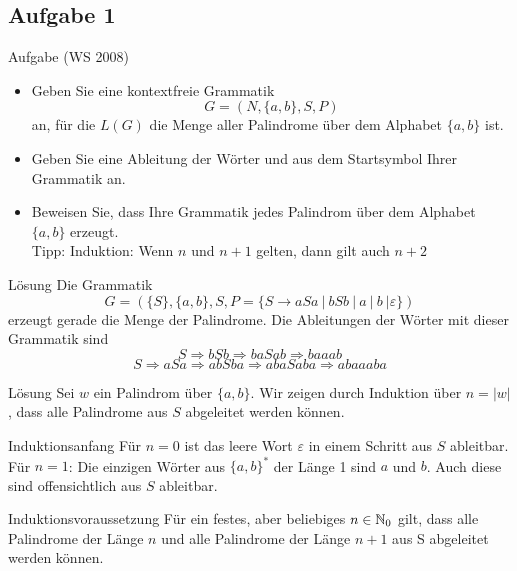 \subsection{Aufgabe 1}
\begin{frame}{Aufgabe (WS 2008) }
	\begin{itemize}
		\item Geben Sie eine kontextfreie Grammatik $$G = (N, \{a, b\}, S, P )$$ an, für die $L(G)$ die Menge aller Palindrome über dem Alphabet $\{a, b\}$ ist.
		\item Geben Sie eine Ableitung der Wörter  und  aus dem Startsymbol Ihrer Grammatik an.
		\item Beweisen Sie, dass Ihre Grammatik jedes Palindrom über dem Alphabet $\{a, b\}$ erzeugt.\\
		Tipp: Induktion: Wenn $n$ und $n+1$ gelten, dann gilt auch $n+2$
	\end{itemize}
\end{frame}

\begin{frame}{Lösung}
	Die Grammatik $$G = (\{S\}, \{a, b\}, S, P = \{S \to aSa \ | \ bSb \ | \ a \ | \ b \ | \varepsilon \})$$ erzeugt gerade die Menge der Palindrome. \pause Die Ableitungen der Wörter mit dieser Grammatik sind 
	$$S \Rightarrow bSb \Rightarrow baSab \Rightarrow baaab$$
	$$S \Rightarrow aSa \Rightarrow abSba \Rightarrow abaSaba \Rightarrow abaaaba$$
\end{frame}

\begin{frame}{Lösung}
	Sei $w$ ein Palindrom über $\{a, b\}$. Wir zeigen durch Induktion über $n = \vert w \vert$, dass alle Palindrome aus $S$ abgeleitet werden können. \pause
	\begin{block}{Induktionsanfang} \pause
		Für $n = 0$ ist das leere Wort $\varepsilon$ in einem Schritt aus $S$ ableitbar. \\
		Für $n=1$: Die einzigen Wörter aus $\{a, b\}^\ast$ der Länge 1 sind $a$ und $b$. Auch diese sind offensichtlich aus $S$ ableitbar.
	\end{block}
 	\pause
	\begin{block}{Induktionsvoraussetzung} \pause
		Für ein festes, aber beliebiges $n \in \mathbb{N}_0$ gilt, dass alle Palindrome der Länge $n$ und alle Palindrome der Länge $n + 1$ aus S abgeleitet werden können.
	\end{block}
\end{frame}

